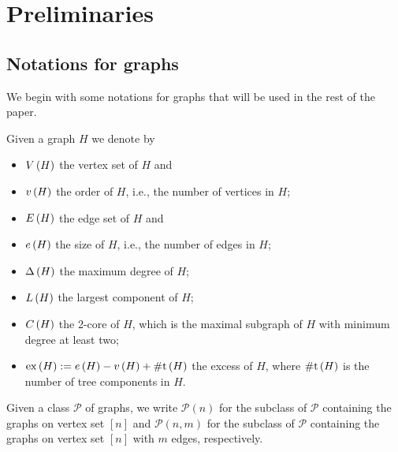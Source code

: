 \section{Preliminaries}\label{PPsec:preliminaries}
\subsection{Notations for graphs}
We begin with some notations for graphs that will be used in the rest of the paper.
\begin{definition}
	Given a graph $H$ we denote by
	\begin{itemize}
		\item 
		$V\left(H\right)$ the vertex set of $H$ and
		\item[]
		$v\left({H}\right)$ the order of $H$, i.e., the number of vertices in $H$;
		\item 
		$E\left(H\right)$ the edge set of $H$ and
		\item[]
		$e\left({H}\right)$ the size of $H$, i.e., the number of edges in $H$;	
		\item
		$\Delta\left(H\right)$ the maximum degree of $H$;
		\item 
		$L\left(H\right)$ the largest component of $H$;
		\item
		$C\left(H\right)$ the 2-core of $H$, which is the maximal subgraph of $H$ with minimum degree at least two;
		\item
		$\operatorname{ex}\left(H\right):=e\left({H}\right)-v\left({H}\right)+\operatorname{\#t}\left(H\right)$ the excess of $H$, where $\operatorname{\#t}\left(H\right)$ is the number of tree components in $H$.
	\end{itemize}
\end{definition}
\begin{definition}\label{PPdef:graph_class}
	Given a class $\mathcal{P}$ of graphs, we write
	$\mathcal{P}(n)$ for the subclass of $\mathcal{P}$ containing the graphs on vertex set $[n]$ 
	and $\mathcal{P}(n,m)$ for the subclass of $\mathcal{P}$ containing the graphs on vertex set $[n]$ with $m$ edges, respectively.
\end{definition}


